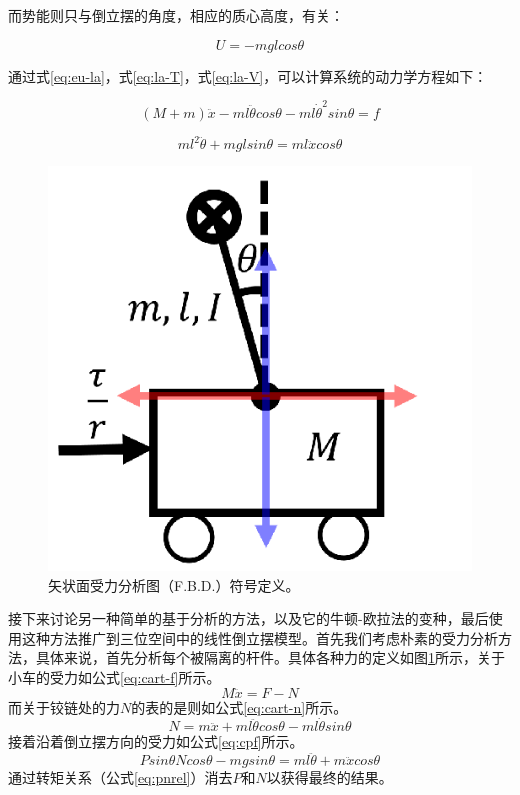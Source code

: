 而势能则只与倒立摆的角度，相应的质心高度，有关：

\begin{equation}
    U=-mglcos \theta
    \label{eq:la-V}
\end{equation}

通过式\ref{eq:eu-la}，式\ref{eq:la-T}，式\ref{eq:la-V}，可以计算系统的动力学方程如下：

\begin{equation}
    (M+m)\ddot{x} - ml\ddot{\theta}cos\theta -ml\dot{\theta}^2 sin\theta = f
    \label{eq:motion1}
\end{equation}

\begin{equation}
    ml^2\ddot{\theta} + mgl sin\theta = ml\ddot{x}cos\theta
    \label{eq:motion2}
\end{equation}

\begin{figure}
  \centering
  \includegraphics[width=0.4\linewidth]{figures/Sec4/2d2.png}
  \caption{
  矢状面受力分析图（F.B.D.）符号定义。
  }
  \label{fig:sec4-2d2}
   \vspace{6pt}
\end{figure}

接下来讨论另一种简单的基于分析的方法，以及它的牛顿-欧拉法的变种，最后使用这种方法推广到三位空间中的线性倒立摆模型。首先我们考虑朴素的受力分析方法，具体来说，首先分析每个被隔离的杆件。具体各种力的定义如图\ref{fig:sec4-2d2}所示，关于小车的受力如公式\ref{eq:cart-f}所示。
\begin{equation}
    M\ddot{x} = F - N
    \label{eq:cart-f}
\end{equation}
而关于铰链处的力$N$的表的是则如公式\ref{eq:cart-n}所示。
\begin{equation}
    N = m\ddot{x} + ml\ddot{\theta}cos \theta - ml\dot{\theta}sin \theta
    \label{eq:cart-n}
\end{equation}
接着沿着倒立摆方向的受力如公式\ref{eq:cpf}所示。
\begin{equation}
    Psin\theta N cos\theta - mgsin \theta = ml\ddot{\theta} + m\ddot{x} cos\theta
    \label{eq:cpf}
\end{equation}
通过转矩关系（公式\ref{eq:pnrel}）消去$P$和$N$以获得最终的结果。

